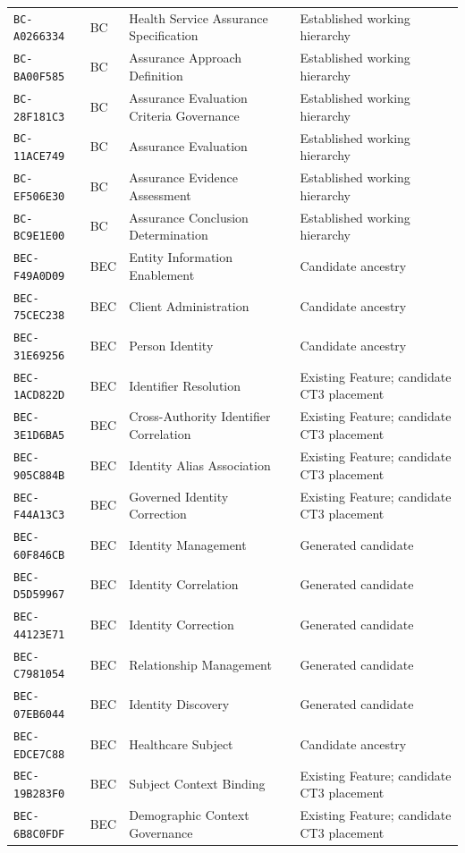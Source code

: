 \documentclass[11pt,a4paper,openany]{book}
\begin{document}
\begin{longtable}{@{}p{.19\linewidth}p{.12\linewidth}p{.39\linewidth}p{.24\linewidth}@{}}
\texttt{BC-A0266334} & BC & Health Service Assurance Specification & Established working hierarchy \\
\texttt{BC-BA00F585} & BC & Assurance Approach Definition & Established working hierarchy \\
\texttt{BC-28F181C3} & BC & Assurance Evaluation Criteria Governance & Established working hierarchy \\
\texttt{BC-11ACE749} & BC & Assurance Evaluation & Established working hierarchy \\
\texttt{BC-EF506E30} & BC & Assurance Evidence Assessment & Established working hierarchy \\
\texttt{BC-BC9E1E00} & BC & Assurance Conclusion Determination & Established working hierarchy \\
\texttt{BEC-F49A0D09} & BEC & Entity Information Enablement & Candidate ancestry \\
\texttt{BEC-75CEC238} & BEC & Client Administration & Candidate ancestry \\
\texttt{BEC-31E69256} & BEC & Person Identity & Candidate ancestry \\
\texttt{BEC-1ACD822D} & BEC & Identifier Resolution & Existing Feature; candidate CT3 placement \\
\texttt{BEC-3E1D6BA5} & BEC & Cross-Authority Identifier Correlation & Existing Feature; candidate CT3 placement \\
\texttt{BEC-905C884B} & BEC & Identity Alias Association & Existing Feature; candidate CT3 placement \\
\texttt{BEC-F44A13C3} & BEC & Governed Identity Correction & Existing Feature; candidate CT3 placement \\
\texttt{BEC-60F846CB} & BEC & Identity Management & Generated candidate \\
\texttt{BEC-D5D59967} & BEC & Identity Correlation & Generated candidate \\
\texttt{BEC-44123E71} & BEC & Identity Correction & Generated candidate \\
\texttt{BEC-C7981054} & BEC & Relationship Management & Generated candidate \\
\texttt{BEC-07EB6044} & BEC & Identity Discovery & Generated candidate \\
\texttt{BEC-EDCE7C88} & BEC & Healthcare Subject & Candidate ancestry \\
\texttt{BEC-19B283F0} & BEC & Subject Context Binding & Existing Feature; candidate CT3 placement \\
\texttt{BEC-6B8C0FDF} & BEC & Demographic Context Governance & Existing Feature; candidate CT3 placement \\

\end{longtable}
\end{document}
